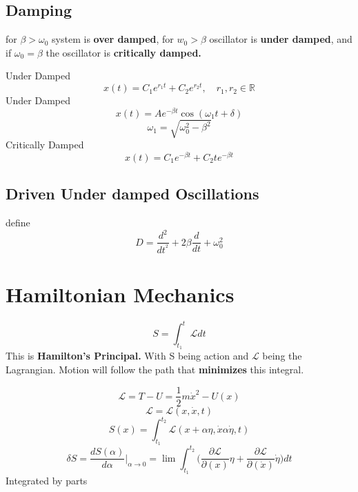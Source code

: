\subsection{Damping}


for $\beta>\omega_{0}$ system is \textbf{over damped}, for $w_{0}>\beta$ oscillator is \textbf{under damped}, and if $\omega_{0}=\beta$ the oscillator is \textbf{critically damped.}

\hfill
\hfill

Under Damped
\begin{equation}
	\label{}
	x(t)=C_{1}e^{r_{1}t}+C_{2}e^{r_{2}t},\quad r_{1},r_{2}\in\mathbb{R}
\end{equation}
Under Damped
\begin{equation}
	\label{}
x(t)=Ae^{-\beta t}\cos(\omega_{1}t+\delta)
\end{equation}
\begin{equation}
	\label{}
	\omega_{1}=\sqrt{\omega_{0}^{2}-\beta^{2}}
\end{equation}
Critically Damped
\begin{equation}
	\label{}
	x(t)=C_{1}e^{-\beta t}+C_{2}te^{-\beta t}
\end{equation}


\subsection{Driven Under damped Oscillations}
define
\begin{equation}
	\label{}
D=\frac{d^{2}}{dt^{^2}}+2\beta \frac{d}{dt}+\omega_{0}^{2}
\end{equation}


\section{Hamiltonian Mechanics}
\begin{equation}
	\label{}
	S=\int_{t_{1}}^{t}\mathcal{L}dt 
\end{equation}
This is \textbf{Hamilton's Principal.}
With S being action and $\mathcal{L}$ being the Lagrangian. Motion will follow the path that \textbf{minimizes} this integral.  

\begin{equation}
	\label{}
	\mathcal{L}=T-U=\frac{1}{2}m\dot{x}^{2}-U(x)
\end{equation}
\begin{equation}
	\label{}
	\mathcal{L}=\mathcal{L}(x,\dot{x},t)
\end{equation}
\begin{equation}
	\label{}
	S(x)=\int_{t_{1}}^{t_{2}}\mathcal{L}(x+\alpha\eta,\dot{x}\alpha\dot{\eta},t)
\end{equation}
\begin{equation}
	\label{}
	\delta S = \frac{dS(\alpha)}{d\alpha}\bigg|_{\alpha\to 0}=\lim\int_{t_{1}}^{t_{2}}\bigg(\frac{\partial\mathcal{L}}{\partial(x)}\eta +\frac{\partial \mathcal{L}}{\partial(\dot{x})}\dot{\eta}\bigg)dt
\end{equation}
Integrated by parts
